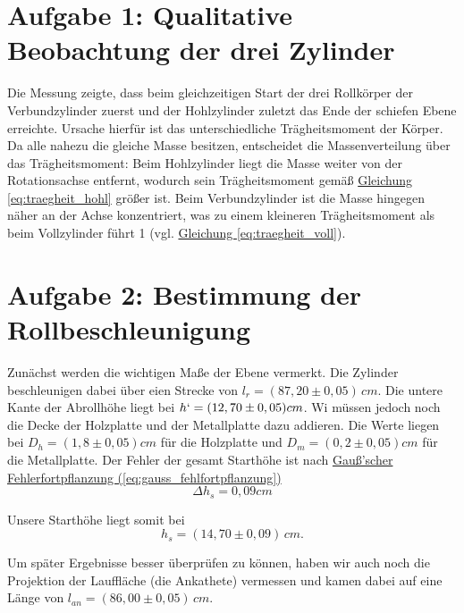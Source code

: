 \twocolumn


\section{Aufgabe 1: Qualitative Beobachtung der drei Zylinder}
Die Messung zeigte, dass beim gleichzeitigen Start der drei Rollkörper der Verbundzylinder 
zuerst und der Hohlzylinder zuletzt das Ende der schiefen Ebene erreichte. 
Ursache hierfür ist das unterschiedliche Trägheitsmoment der Körper. 
Da alle nahezu die gleiche Masse besitzen, entscheidet die Massenverteilung über das Trägheitsmoment: 
Beim Hohlzylinder liegt die Masse weiter von der Rotationsachse entfernt, wodurch sein 
Trägheitsmoment gemäß \hyperref[eq:traegheit_hohl]{Gleichung \ref*{eq:traegheit_hohl}} größer ist. 
Beim Verbundzylinder ist die Masse hingegen näher an der Achse konzentriert, was zu einem kleineren Trägheitsmoment als beim Vollzylinder führt 1
(vgl. \hyperref[eq:traegheit_voll]{Gleichung \ref*{eq:traegheit_voll}}).


\section{Aufgabe 2: Bestimmung der Rollbeschleunigung}
Zunächst werden die wichtigen Maße der Ebene vermerkt. Die Zylinder beschleunigen dabei über eien Strecke von $l_{r} = (87,20 \pm 0,05) \, cm$. Die untere Kante der Abrollhöhe liegt bei $h` = (12,70 \pm 0,05) cm$. Wi müssen jedoch noch die Decke der Holzplatte und der Metallplatte dazu addieren. Die Werte liegen bei $D_h= (1,8 \pm 0,05) cm$ für die Holzplatte und $D_m= (0,2 \pm 0,05) cm$ für die Metallplatte.
Der Fehler der gesamt Starthöhe ist nach \hyperref[eq:gauss_fehlfortpflanzung]{Gauß'scher Fehlerfortpflanzung (\ref*{eq:gauss_fehlfortpflanzung})}
\begin{equation}
    \Delta h_s = 0,09 cm
\end{equation}

Unsere Starthöhe liegt somit bei
\begin{equation}
    h_s = (14,70 \pm 0,09)\, cm.
\end{equation}

Um später Ergebnisse besser überprüfen zu können, haben wir auch noch die Projektion der Lauffläche (die Ankathete) vermessen und kamen dabei auf eine Länge von $l_{an} = (86,00 \pm 0,05) \, cm$.
